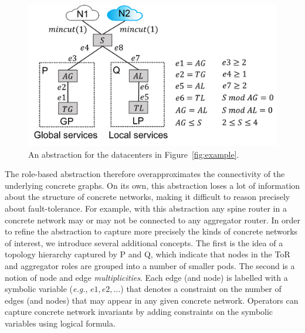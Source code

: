 \documentclass[numbers, 10pt, preprint]{sigplanconf}
\newcommand{\EG}{\emph{e.g.}}
\begin{document}
\begin{figure}[t!]
  \centering
  \includegraphics[width=\columnwidth]{figures/example3}
  \vspace{-2em}
  \caption{An abstraction for the datacenters in Figure~\ref{fig:example}.}
  \label{fig:example3}
  \vspace{-1em}
\end{figure}

The role-based abstraction therefore overapproximates the connectivity of the underlying concrete graphs. On its own, this abstraction loses a lot of information about the structure of concrete networks, making it difficult to reason precisely about fault-tolerance.
For example, with this abstraction any spine router in a concrete network may or may not be connected to any aggregator router.
%
In order to refine the abstraction to capture more precisely the kinds of concrete networks of interest,
we introduce several additional concepts. The first is the idea of a topology hierarchy captured by P and Q, which indicate that nodes in the ToR and aggregator roles are grouped into a number of smaller pods.
The second is a notion of node and edge \emph{multiplicities}. Each edge (and node) is labelled
with a symbolic variable (\EG, $e1, e2, \ldots$) that denotes a constraint on the number of edges (and nodes) that may appear in any given concrete network. Operators can capture concrete network invariants by adding constraints on the symbolic variables using logical formula.
\end{document}

